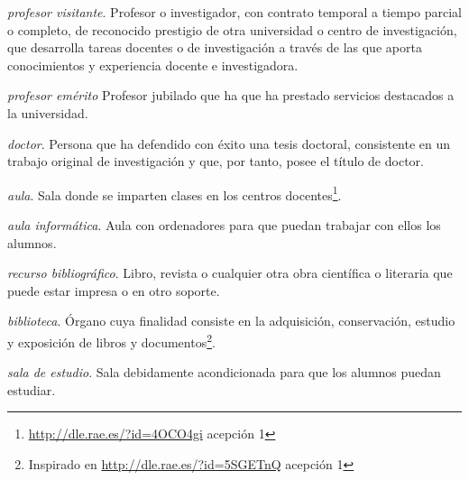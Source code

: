     \item \emph{profesor visitante}. Profesor o investigador, con contrato
        temporal a tiempo parcial o completo, de reconocido prestigio de otra
        universidad o centro de investigación, que desarrolla tareas docentes o
        de investigación a través de las que aporta conocimientos y experiencia
        docente e investigadora\cite[artículo 54]{leyUniversidades}.

    \item \emph{profesor emérito} Profesor jubilado que ha que ha prestado
        servicios destacados a la universidad\cite[artículo 54bis]{leyUniversidades}.

    \item \emph{doctor}. Persona que ha defendido con éxito una tesis doctoral,
        consistente en un trabajo original de investigación y que, por tanto,
        posee el título de doctor.

    \item \emph{aula}. Sala donde se imparten clases en los centros
        docentes\footnote{\url{http://dle.rae.es/?id=4OCO4gi} acepción 1}.

    \item \emph{aula informática}. Aula con ordenadores para que puedan
        trabajar con ellos los alumnos.

    \item \emph{recurso bibliográfico}. Libro, revista o cualquier otra obra
        científica o literaria que puede estar impresa o en otro soporte. 

    \item \emph{biblioteca}. Órgano cuya finalidad consiste en la adquisición,
        conservación, estudio y exposición de libros y
        documentos\footnote{Inspirado en \url{http://dle.rae.es/?id=5SGETnQ}
        acepción 1}.

    \item \emph{sala de estudio}. Sala debidamente acondicionada para que los
        alumnos puedan estudiar. 

{}

